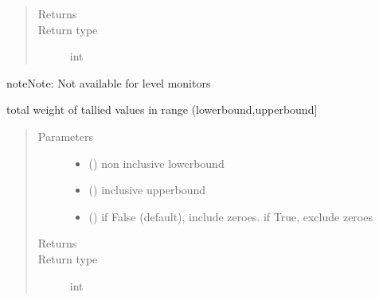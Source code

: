 \documentclass[letterpaper,10pt,english]{sphinxmanual}
\begin{document}
\begin{fulllineitems}
\begin{fulllineitems}
\begin{quote}
\begin{description}
\begin{itemize}
\end{itemize}

\item[{Returns}] \leavevmode
{}

\item[{Return type}] \leavevmode
int

\end{description}\end{quote}

\begin{sphinxadmonition}{note}{Note:}
Not available for level monitors
\end{sphinxadmonition}

\end{fulllineitems}


\begin{fulllineitems}
\label{\detokenize{Reference:salabim.Monitor.bin_weight}}
total weight of tallied values in range (lowerbound,upperbound{]}
\begin{quote}\begin{description}
\item[{Parameters}] \leavevmode\begin{itemize}
\item {} 
 () \textendash{} non inclusive lowerbound

\item {} 
 () \textendash{} inclusive upperbound

\item {} 
 () \textendash{} if False (default), include zeroes. if True, exclude zeroes

\end{itemize}

\item[{Returns}] \leavevmode
{}

\item[{Return type}] \leavevmode
int

\end{description}\end{quote}


\end{fulllineitems}
\end{fulllineitems}
\end{document}
